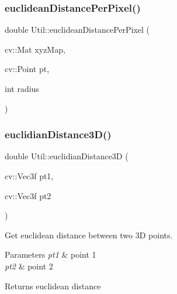 \hypertarget{class_util_ad189ee83cefd79e724047cb6283eb4ac}{}\label{class_util_ad189ee83cefd79e724047cb6283eb4ac} 
\subsubsection{\texorpdfstring{euclidean\+Distance\+Per\+Pixel()}{euclideanDistancePerPixel()}}
{\footnotesize\ttfamily double Util\+::euclidean\+Distance\+Per\+Pixel (\begin{DoxyParamCaption}\item[{cv\+::\+Mat}]{xyz\+Map,  }\item[{cv\+::\+Point}]{pt,  }\item[{int}]{radius }\end{DoxyParamCaption})\hspace{0.3cm}{\ttfamily [static]}}

\hypertarget{class_util_afcaa0a0b92e0fd117be8dead6a7787f3}{}\label{class_util_afcaa0a0b92e0fd117be8dead6a7787f3} 
\subsubsection{\texorpdfstring{euclidian\+Distance3\+D()}{euclidianDistance3D()}}
{\footnotesize\ttfamily double Util\+::euclidian\+Distance3D (\begin{DoxyParamCaption}\item[{cv\+::\+Vec3f}]{pt1,  }\item[{cv\+::\+Vec3f}]{pt2 }\end{DoxyParamCaption})\hspace{0.3cm}{\ttfamily [static]}}



Get euclidean distance between two 3D points. 


\begin{DoxyParams}{Parameters}
{\em pt1} & point 1 \\
\hline
{\em pt2} & point 2 \\
\hline
\end{DoxyParams}
\begin{DoxyReturn}{Returns}
euclidean distance 
\end{DoxyReturn}
\hypertarget{class_util_a0d0aff128bc986da5140cacd41759e0e}{}\label{class_util_a0d0aff128bc986da5140cacd41759e0e} 
